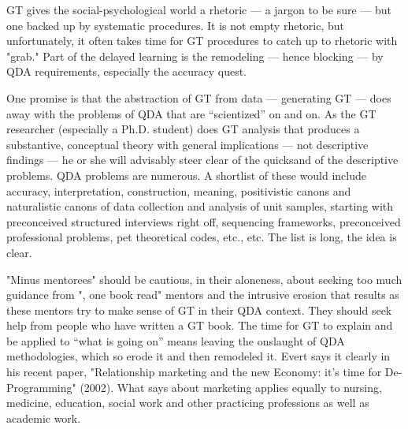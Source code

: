 GT gives the social-psychological world a rhetoric
--- a jargon to be sure ---
but one backed up by systematic procedures. 
It is not empty rhetoric, 
but unfortunately, it often takes time for GT procedures to catch up to rhetoric with "grab." 
Part of the delayed learning is the remodeling --- hence blocking --- by QDA requirements, 
especially the accuracy quest.

One promise is that the abstraction of GT from data
--- generating GT ---
does away with the problems of QDA that are “scientized” on and on. 
As the GT researcher (especially a Ph.D. student) does GT analysis that produces a substantive, 
conceptual theory with general implications
--- not descriptive findings
--- he or she will advisably steer clear of the quicksand of the descriptive
problems. 
QDA problems are numerous. 
A shortlist of these would include accuracy, interpretation, 
construction, meaning, positivistic canons and
naturalistic canons of data collection and analysis of unit samples, starting with preconceived structured interviews right off, 
sequencing frameworks, preconceived professional problems, 
pet theoretical codes, etc., etc. 
The list is long, the idea is clear.

"Minus mentorees" should be cautious, in their aloneness, 
about seeking too much guidance from ", one book read" mentors and the intrusive erosion that results as these mentors try to make sense of GT in their QDA context.
They should seek help from people who have written a GT book.
The time for GT to explain and be applied to “what is going on” means leaving the onslaught of QDA methodologies, 
which so erode it and then remodeled it.
Evert 
\citeauthor{article.gummensson02}
says it clearly in his recent paper, 
"Relationship marketing and the new Economy: it’s time for De-Programming" (2002). 
What 
\citeauthor{article.gummensson02}
says about marketing applies equally to nursing, medicine, education, 
social work and other practicing professions as well as academic work.

